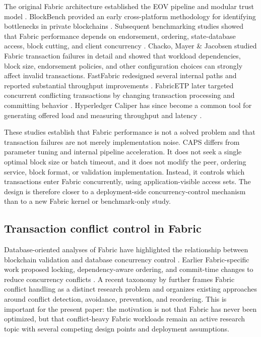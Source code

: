 \documentclass[fleqn,10pt,lineno]{wlpeerj}
\begin{document}
The original Fabric architecture established the EOV pipeline and modular trust model \citep{androulaki2018fabric}. BlockBench provided an early cross-platform methodology for identifying bottlenecks in private blockchains \citep{dinh2017blockbench}. Subsequent benchmarking studies showed that Fabric performance depends on endorsement, ordering, state-database access, block cutting, and client concurrency \citep{thakkar2018performance}. Chacko, Mayer \& Jacobsen \citep{chacko2021failures} studied Fabric transaction failures in detail and showed that workload dependencies, block size, endorsement policies, and other configuration choices can strongly affect invalid transactions. FastFabric redesigned several internal paths and reported substantial throughput improvements \citep{gorenflo2019fastfabric}. FabricETP later targeted concurrent conflicting transactions by changing transaction processing and committing behavior \citep{wu2023fabricetp}. Hyperledger Caliper has since become a common tool for generating offered load and measuring throughput and latency \citep{caliperdocs}.

These studies establish that Fabric performance is not a solved problem and that transaction failures are not merely implementation noise. CAPS differs from parameter tuning and internal pipeline acceleration. It does not seek a single optimal block size or batch timeout, and it does not modify the peer, ordering service, block format, or validation implementation. Instead, it controls which transactions enter Fabric concurrently, using application-visible access sets. The design is therefore closer to a deployment-side concurrency-control mechanism than to a new Fabric kernel or benchmark-only study.

\subsection*{Transaction conflict control in Fabric}

Database-oriented analyses of Fabric have highlighted the relationship between blockchain validation and database concurrency control \citep{sharma2019blurring}. Earlier Fabric-specific work proposed locking, dependency-aware ordering, and commit-time changes to reduce concurrency conflicts \citep{xu2020concurrency,wu2023fabricetp}. A recent taxonomy by \citet{debreczeni2024taxonomy} further frames Fabric conflict handling as a distinct research problem and organizes existing approaches around conflict detection, avoidance, prevention, and reordering. This is important for the present paper: the motivation is not that Fabric has never been optimized, but that conflict-heavy Fabric workloads remain an active research topic with several competing design points and deployment assumptions.
\end{document}
